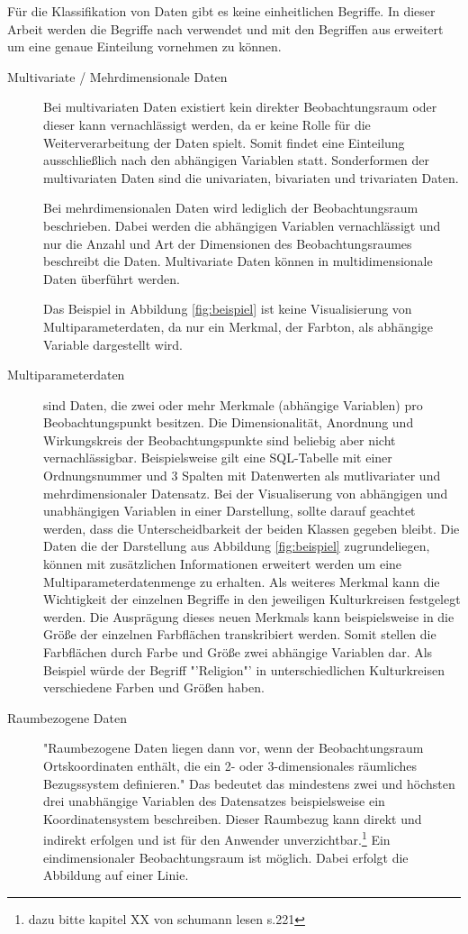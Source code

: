 \documentclass[a4paper, 12pt, DIVcalc, onepage, pdftex, headsepline, footsepline]{scrreprt}
\begin{document}
Für die Klassifikation von Daten gibt es keine einheitlichen Begriffe. 
In dieser Arbeit werden die Begriffe nach \citep{Schumann} verwendet und mit den Begriffen aus \citep{Preim}
erweitert um eine genaue Einteilung vornehmen zu können.
\begin{description}
\item[Multivariate / Mehrdimensionale Daten]
Bei multivariaten Daten existiert kein direkter Beobachtungsraum oder dieser kann vernachlässigt werden, da er
keine Rolle für die Weiterverarbeitung der Daten spielt. Somit findet eine Einteilung ausschließlich nach den
abhängigen Variablen statt. Sonderformen der multivariaten Daten sind die univariaten,
bivariaten und trivariaten Daten.

Bei mehrdimensionalen Daten wird lediglich der Beobachtungsraum beschrieben. Dabei werden die abhängigen Variablen
vernachlässigt und nur die Anzahl und Art der Dimensionen des Beobachtungsraumes beschreibt die Daten.
Multivariate Daten können in multidimensionale Daten überführt werden.

Das Beispiel in Abbildung \ref{fig:beispiel} ist keine Visualisierung von Multiparameterdaten,
da nur ein Merkmal, der Farbton, als abhängige Variable dargestellt wird.

\item[Multiparameterdaten]
sind Daten, die zwei oder mehr Merkmale (abhängige Variablen) pro Beobachtungspunkt besitzen. Die Dimensionalität,
Anordnung und Wirkungskreis der Beobachtungspunkte sind beliebig aber nicht vernachlässigbar.
Beispielsweise gilt eine SQL-Tabelle mit einer Ordnungsnummer und 3 Spalten mit Datenwerten
als mutlivariater und mehrdimensionaler Datensatz.
Bei der Visualiserung von abhängigen und unabhängigen Variablen in einer Darstellung, sollte darauf geachtet
werden, dass die Unterscheidbarkeit der beiden Klassen gegeben bleibt.
Die Daten die der Darstellung aus Abbildung \ref{fig:beispiel} zugrundeliegen, können mit zusätzlichen
Informationen erweitert werden um eine Multiparameterdatenmenge zu erhalten. Als weiteres Merkmal kann die
Wichtigkeit der einzelnen Begriffe in den jeweiligen Kulturkreisen festgelegt werden.
Die Ausprägung dieses neuen Merkmals kann beispielsweise in die Größe der einzelnen Farbflächen transkribiert
werden. Somit stellen die Farbflächen durch Farbe und Größe zwei abhängige Variablen dar. Als Beispiel
würde der Begriff "'Religion"' in unterschiedlichen Kulturkreisen verschiedene Farben und Größen haben.

\item[Raumbezogene Daten]
"Raumbezogene Daten liegen dann vor, wenn der Beobachtungsraum Ortskoordinaten enthält,
die ein 2- oder 3-dimensionales räumliches Bezugssystem definieren."\citep[S.\,219]{Schumann}
Das bedeutet das mindestens zwei und höchsten drei unabhängige Variablen des Datensatzes beispielsweise
ein Koordinatensystem beschreiben. Dieser Raumbezug kann direkt und indirekt erfolgen und ist für
den Anwender unverzichtbar.\footnote{dazu bitte kapitel XX von schumann lesen s.221}
Ein eindimensionaler Beobachtungsraum ist möglich. Dabei erfolgt die Abbildung auf einer Linie.


\end{description}
\end{document}
